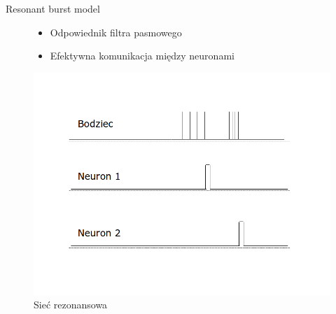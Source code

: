 \documentclass{beamer}
\begin{document}
\begin{frame}{Resonant burst model}
	\begin{figure}[ht]
		\begin{minipage}{0.48\linewidth}
			\begin{itemize}
				\item Odpowiednik filtra pasmowego
				\item Efektywna komunikacja między neuronami
			\end{itemize}
		\end{minipage}
		\hfill
		\begin{minipage}{0.48\linewidth}
		\centering
		\includegraphics[width=\textwidth]{ResonantBurst.png}
		\caption{Sieć rezonansowa}
		\end{minipage}
	\end{figure}
\end{frame}
\end{document}
